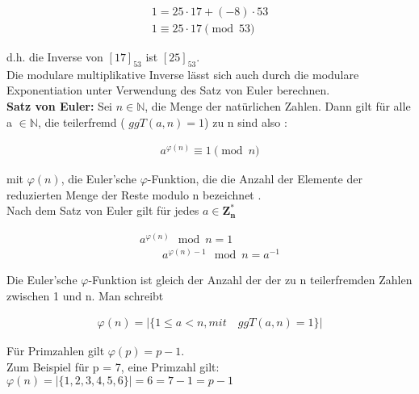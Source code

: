 \begin{ceqn}
\begin{align*}
              1 = 25 \cdot 17 + (-8) \cdot 53 \\
              1 \equiv 25 \cdot 17 \pmod 53
\end{align*}
\end{ceqn}
d.h. die Inverse von $[17]_{53}$ ist $[25]_{53}$. \\

Die modulare multiplikative Inverse lässt sich auch durch die modulare Exponentiation unter Verwendung des Satz von Euler berechnen. \\


\textbf{Satz von Euler:}\quad
Sei \(n \in \mathbb{N}\), die Menge der natürlichen Zahlen. Dann
gilt für alle a \(\in \mathbb{N}\), die teilerfremd ( $ ggT(a, n) = 1 $)
zu n sind also \cite{langMIE}: \\

\begin{ceqn}
\begin{align*}
            a^{\varphi(n)} \equiv 1 \pmod n
\end{align*}
\end{ceqn}
mit $ \varphi(n)$, die Euler’sche $\varphi$-Funktion, die die Anzahl der Elemente der
reduzierten Menge der Reste modulo n bezeichnet \cite{damer}. \\

Nach dem Satz von Euler gilt für jedes \(a \in \mathbf{Z^*_n} \)\\

\begin{ceqn}
\begin{align*}
            a^{\varphi(n)} \mod n = 1 \\
    \qquad  a^{\varphi(n) - 1} \mod n = a^{-1}
\end{align*}
\end{ceqn}

Die Euler'sche $\varphi$-Funktion ist gleich der Anzahl der der zu n
teilerfremden Zahlen zwischen 1 und n. Man schreibt \\

\begin{ceqn}
\begin{align*}
         \varphi(n) = |\{ 1 \leq a < n, mit \quad ggT(a, n) = 1 \}|
\end{align*}
\end{ceqn}

Für Primzahlen gilt \(\varphi(p) = p - 1 \). \\
Zum Beispiel für p = 7, eine Primzahl gilt: \\
\(\varphi(n) = |\{ 1, 2, 3, 4, 5, 6 \}| = 6 = 7 - 1 = p - 1\) \\

